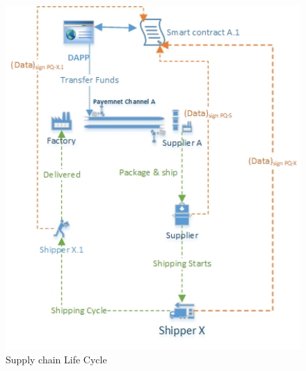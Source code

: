 \begin{figure}[h]
	\centering
    \includegraphics[width=140mm,scale=1]{figs/monitoring_subdiag}
	\caption{Supply chain Life Cycle}
	\label{fig:monitoring_subdiag} 
\end{figure}

